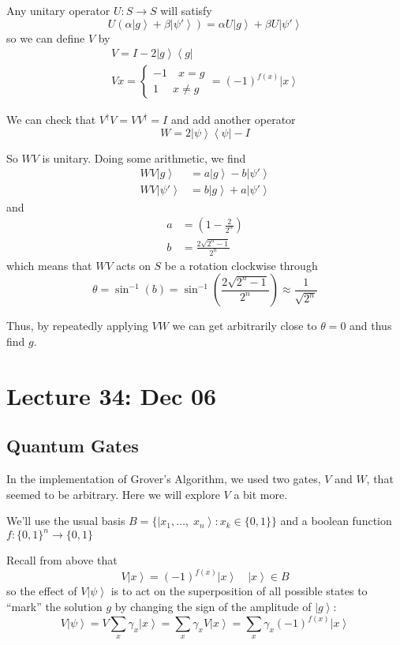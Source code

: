 \documentclass[12pt]{article}
\newcommand{\bra}[1]{\left\langle #1 \right\vert }
\newcommand{\ket}[1]{\left\vert #1 \right\rangle}
\begin{document}
        Any unitary operator $U: S \to S$ will satisfy 
        \[U(\alpha\ket{g} + \beta\ket{\psi'}) = \alpha U\ket{g} + \beta U\ket{\psi'}\]
        so we can define $V$ by
        \begin{gather*}
            V = I - 2\ket{g}\bra{g}\\
            Vx = \begin{cases}
                -1 \quad x = g\\
                1 \quad\; x \neq g 
            \end{cases} = (-1)^{f(x)} \ket{x}
        \end{gather*}

        We can check that $V^\dagger V = VV^\dagger = I$ and add another operator 
        \[W = 2\ket{\psi}\bra{\psi} - I\]

        So $WV$ is unitary. Doing some arithmetic, we find
        \begin{align*}
            WV\ket{g} &= a\ket{g} - b\ket{\psi'}\\
            WV\ket{\psi'} &= b\ket{g} + a\ket{\psi'}
        \end{align*}
        and 
        \begin{align*}
            a &= (1 - \frac{2}{2^n})\\ 
            b &= \frac{2\sqrt{2^n - 1}}{2^n}
        \end{align*}
        which means that $WV$ acts on $S$ be a rotation clockwise through 
        \[\theta = \sin^{-1}(b) = \sin^{-1}(\frac{2\sqrt{2^n-1}}{2^n}) \approx \frac{1}{\sqrt{2^n}}\]

        Thus, by repeatedly applying $VW$ we can get arbitrarily close to $\theta = 0$ and thus find $g$. 

\section*{Lecture 34: Dec 06}
    \subsection*{Quantum Gates}
        In the implementation of Grover's Algorithm, we used two gates, $V$ and $W$, that seemed to be arbitrary. Here we will explore $V$ a bit more. 

        We'll use the usual basis $B = \{\ket{x_1, \dots,\; x_n} : x_k \in \{0, 1\}\}$ and a boolean function $f: \{0, 1\}^n \to \{0, 1\}$

        Recall from above that 
        \[V \ket{x} = (-1)^{f(x)}\ket{x} \quad \ket{x}\in B\]
        so the effect of $V\ket{\psi}$ is to act on the superposition of all possible states to ``mark'' the solution $g$ by changing the sign of the amplitude of $\ket{g}$: 
        \[V\ket{\psi} = V\sum_x \gamma_x \ket{x} = \sum_x \gamma_x V\ket{x} = \sum_x \gamma_x (-1)^{f(x)}\ket{x}\]
\end{document}
